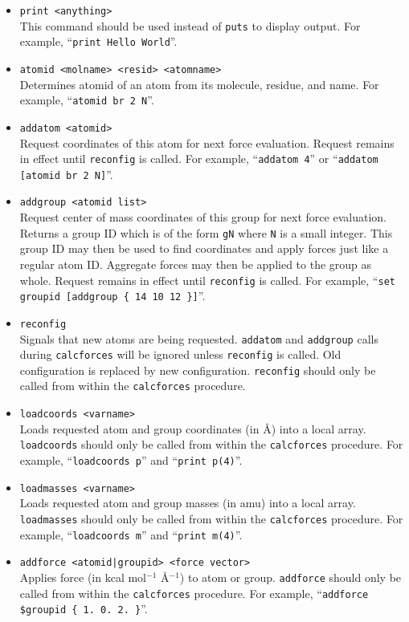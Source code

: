 \begin{itemize}

\item
\verb!print <anything>! \\
This command should be used instead of \verb!puts! to display output.
For example, ``\verb&print Hello World&''.

\item
\verb!atomid <molname> <resid> <atomname>! \\
Determines atomid of an atom from its molecule, residue, and name.
For example, ``\verb!atomid br 2 N!''.

\item
\verb!addatom <atomid>! \\
Request coordinates of this atom for next force evaluation.
Request remains in effect until \verb!reconfig! is called.
For example, ``\verb!addatom 4!'' or ``\verb!addatom [atomid br 2 N]!''.

\item
\verb!addgroup <atomid list>! \\
Request center of mass coordinates of this group for next force evaluation.
Returns a group ID which is of the form \verb!gN! where \verb!N! is a small integer.
This group ID may then be used to find coordinates and apply forces just like a regular atom ID.
Aggregate forces may then be applied to the group as whole.
Request remains in effect until \verb!reconfig! is called.
For example, ``\verb!set groupid [addgroup { 14 10 12 }]!''.

\item
\verb!reconfig! \\
Signals that new atoms are being requested.
\verb!addatom! and \verb!addgroup! calls during \verb!calcforces! will be ignored unless \verb!reconfig! is called.
Old configuration is replaced by new configuration.
\verb!reconfig! should only be called from within the \verb!calcforces! procedure.

\item
\verb!loadcoords <varname>! \\
Loads requested atom and group coordinates (in \AA) into a local array.
\verb!loadcoords! should only be called from within the \verb!calcforces! procedure.
For example, ``\verb!loadcoords p!'' and ``\verb!print p(4)!''.

\item
\verb!loadmasses <varname>! \\
Loads requested atom and group masses (in amu) into a local array.
\verb!loadmasses! should only be called from within the \verb!calcforces! procedure.
For example, ``\verb!loadcoords m!'' and ``\verb!print m(4)!''.

\item
\verb!addforce <atomid|groupid> <force vector>! \\
Applies force (in kcal mol$^{-1}$ \AA$^{-1}$) to atom or group.
\verb!addforce! should only be called from within the \verb!calcforces! procedure.
For example, ``\verb!addforce $groupid { 1. 0. 2. }!''.

\end{itemize}

